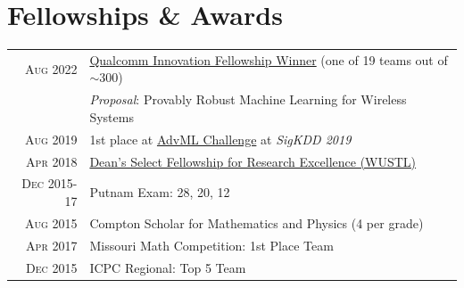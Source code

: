 \documentclass[a4paper,10pt]{article}
\begin{document}
\section{Fellowships \& Awards}
\begin{tabular}{r|p{11cm}}
\textsc{Aug} 2022 & \href{https://www.qualcomm.com/research/university-relations/innovation-fellowship/2022-north-america}{Qualcomm Innovation Fellowship Winner} (one of 19 teams out of $\sim$300)\\
& \textit{Proposal}: Provably Robust Machine Learning for Wireless Systems \\
\textsc{Aug} 2019 & 1st place at \href{https://sites.google.com/view/advml/advml19-challenge}{AdvML Challenge} at \textit{SigKDD 2019} \\
\textsc{Apr} 2018 & \href{https://eece.wustl.edu/academics/graduate-programs/Graduate-Fellowships-Scholarships.html}{Dean's Select Fellowship for Research Excellence (WUSTL)} \\
\textsc{Dec} 2015-17 & Putnam Exam: 28, 20, 12 \\
\textsc{Aug} 2015 & Compton Scholar for Mathematics and Physics (4 per grade) \\
\textsc{Apr} 2017 & Missouri Math Competition: 1st Place Team \\
\textsc{Dec} 2015 & ICPC Regional: Top 5 Team
\end{tabular}


\end{document}
